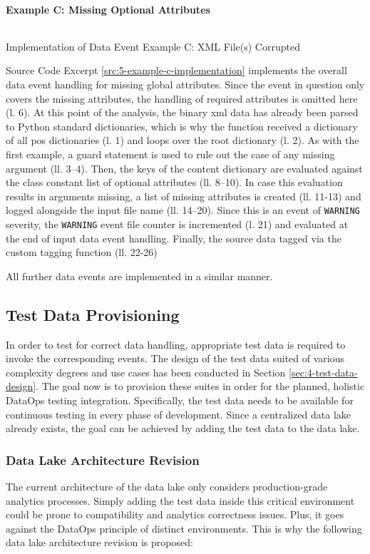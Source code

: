 \paragraph{Example C: Missing Optional Attributes}
\begin{listing}[h!]
	\inputminted{python}{main-matter/src/5-c.py}
	\caption{Implementation of Data Event Example C: XML File(s) Corrupted}
	\label{src:5-example-c-implementation}
\end{listing}
Source Code Excerpt \ref{src:5-example-c-implementation} implements the overall data event handling for missing global attributes. Since the event in question only covers the missing attributes, the handling of required attributes is omitted here (l. 6). At this point of the analysis, the binary \ac{xml} data has already been parsed to Python standard dictionaries, which is why the function received a dictionary of all \ac{pos} dictionaries (l. 1) and loops over the root dictionary (l. 2). As with the first example, a guard statement is used to rule out the case of any missing argument (ll. 3--4). Then, the keys of the content dictionary are evaluated against the class constant list of optional attributes (ll. 8--10). In case this evaluation results in arguments missing, a list of missing attributes is created (ll. 11-13) and logged alongside the input file name (ll. 14--20). Since this is an event of \texttt{WARNING} severity, the \texttt{WARNING} event file counter is incremented (l. 21) and evaluated at the end of input data event handling. Finally, the source data tagged via the custom tagging function (ll. 22-26)

All further data events are implemented in a similar manner.

\subsection{Test Data Provisioning}
In order to test for correct data handling, appropriate test data is required to invoke the corresponding events. The design of the test data suited of various complexity degrees and use cases has been conducted in Section \ref{sec:4-test-data-design}. The goal now is to provision these suites in order for the planned, holistic DataOps testing integration. Specifically, the test data needs to be available for continuous testing in every phase of development. Since a centralized data lake already exists, the goal can be achieved by adding the test data to the data lake.

\subsubsection{Data Lake Architecture Revision}
The current architecture of the data lake only considers production-grade analytics processes. Simply adding the test data inside this critical environment could be prone to compatibility and analytics correctness issues. Plus, it goes against the DataOps principle of distinct environments. This is why the following data lake architecture revision is proposed:

